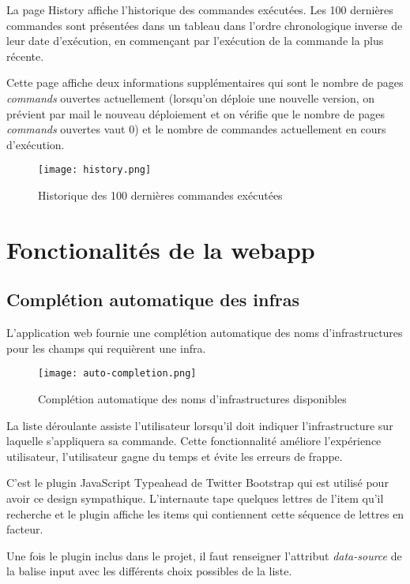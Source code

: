 La page History affiche l'historique des commandes exécutées.
Les 100 dernières commandes sont présentées dans un tableau dans l'ordre
chronologique inverse de leur date d'exécution, en commençant par l'exécution de
la commande la plus récente.

Cette page affiche deux informations supplémentaires qui sont le nombre de
pages \textit{commands} ouvertes actuellement (lorsqu'on déploie une nouvelle version,
on prévient par mail le nouveau déploiement et on vérifie que le nombre de pages
\textit{commands} ouvertes vaut 0) et le nombre de commandes actuellement en cours
d'exécution.

\begin{figure}[H]
  \texttt{[image: history.png]}  
  \caption{Historique des 100 dernières commandes exécutées}
\end{figure}

\section{Fonctionalités de la webapp}

\subsection{Complétion automatique des infras}

L'application web fournie une complétion automatique des noms d'infrastructures
pour les champs qui requièrent une infra.

\begin{figure}[H]
  \texttt{[image: auto-completion.png]}
  \caption{Complétion automatique des noms d'infrastructures disponibles}
\end{figure}

La liste déroulante assiste l'utilisateur lorsqu'il doit indiquer
l'infrastructure sur laquelle s'appliquera sa commande.
Cette fonctionnalité améliore l'expérience utilisateur, l'utilisateur gagne du
temps et évite les erreurs de frappe.

C'est le plugin JavaScript Typeahead de Twitter Bootstrap qui est utilisé pour
avoir ce design sympathique. L'internaute tape quelques lettres de l'item qu'il
recherche et le plugin affiche les items qui contiennent cette séquence de
lettres en facteur.

Une fois le plugin inclus dans le projet, il faut renseigner l'attribut
\textit{data-source} de la balise input avec les différents choix possibles de
la liste.

